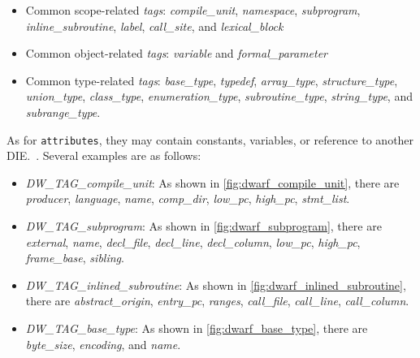 \begin{itemize}
    \item Common scope-related \textit{tags}: \textit{compile\_unit}, \textit{namespace}, \textit{subprogram}, \textit{inline\_subroutine},  \textit{label}, \textit{call\_site}, and \textit{lexical\_block} 
    
    \item Common object-related \textit{tags}: \textit{variable} and \textit{formal\_parameter}

    \item Common type-related \textit{tags}: \textit{base\_type}, \textit{typedef}, \textit{array\_type}, \textit{structure\_type}, \textit{union\_type}, \textit{class\_type}, \textit{enumeration\_type}, \textit{subroutine\_type}, \textit{string\_type}, and \textit{subrange\_type}.
\end{itemize}

As for \texttt{attributes}, they may contain constants, variables, or reference to another DIE.~\cite{dwarf}. Several examples are as follows:

\begin{itemize}
    \item \textit{DW\_TAG\_compile\_unit}: As shown in \ref{fig:dwarf_compile_unit}, there are \textit{producer}, \textit{language}, \textit{name}, \textit{comp\_dir}, \textit{low\_pc}, \textit{high\_pc}, \textit{stmt\_list}.
    
    \item \textit{DW\_TAG\_subprogram}: As shown in \ref{fig:dwarf_subprogram}, there are \textit{external}, \textit{name}, \textit{decl\_file}, \textit{decl\_line}, \textit{decl\_column}, \textit{low\_pc}, \textit{high\_pc}, \textit{frame\_base}, \textit{sibling}.

    \item \textit{DW\_TAG\_inlined\_subroutine}: As shown in \ref{fig:dwarf_inlined_subroutine}, there are \textit{abstract\_origin}, \textit{entry\_pc}, \textit{ranges}, \textit{call\_file}, \textit{call\_line}, \textit{call\_column}.

    \item \textit{DW\_TAG\_base\_type}: As shown in \ref{fig:dwarf_base_type}, there are \textit{byte\_size}, \textit{encoding}, and \textit{name}.
\end{itemize}

